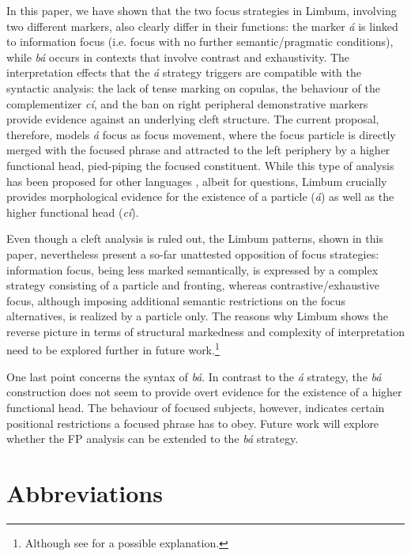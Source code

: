 \documentclass[output=paper,
modfonts
]{langscibook}
\begin{document}
In this paper, we have shown that the two focus strategies in Limbum, involving two different markers, also clearly differ in their functions: the marker \textit{á} is linked to information focus (i.e. focus with no further semantic/pragmatic conditions), while \textit{bá} occurs in contexts that involve contrast and exhaustivity. The interpretation effects that the {\em \'a} strategy triggers are compatible with the syntactic analysis: the lack of tense marking on copulas, the behaviour of the complementizer \textit{cí}, and the ban on right peripheral demonstrative markers provide evidence against an underlying cleft structure. The current proposal, therefore, models {\em\'a} focus as focus movement, where the focus particle is directly merged with the focused phrase and attracted to the left periphery by a higher functional head, pied-piping the focused constituent. While this type of analysis has been proposed for other languages \citep{Hagstrom1998,Cable2010}, albeit for questions, Limbum crucially provides morphological evidence for the existence of a particle ({\em \'a}) as well as the higher functional head ({\em c\'i}).

Even though a cleft analysis is ruled out, the Limbum patterns, shown in this paper, nevertheless present a so-far unattested opposition of focus strategies: information focus, being less marked semantically, is expressed by a complex strategy consisting of a particle and fronting, whereas contrastive/exhaustive focus, although imposing additional semantic restrictions on the focus alternatives, is realized by a particle only. The reasons why Limbum shows the reverse picture in terms of structural markedness and complexity of interpretation need to be explored further in future work.\footnote{Although see \citet{Driemeltoappear} for a possible explanation.}

One last point concerns the syntax of {\em b\'a}. In contrast to the {\em \'a} strategy, the {\em b\'a} construction does not seem to provide overt evidence for the existence of a higher functional head. The behaviour of focused subjects, however, indicates certain positional restrictions a focused phrase has to obey. Future work will explore whether the FP analysis can be extended to the {\em b\'a} strategy.


\section*{Abbreviations}
\end{document}
